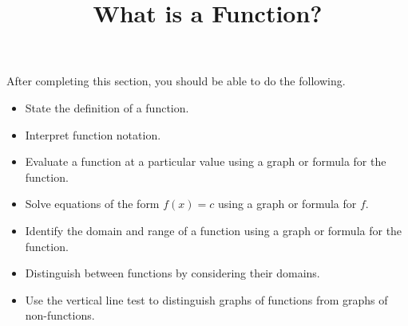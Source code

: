 \documentclass{ximera}
\title{What is a Function?}
\begin{document}
\begin{abstract} 
\end{abstract}

\maketitle

\begin{sectionOutcomes}
After completing this section, you should be able to do the following.

\begin{itemize}
	\item State the definition of a function.
	\item Interpret function notation.
	\item Evaluate a function at a particular value using a graph or formula for the function.
	\item Solve equations of the form $f(x) = c$ using a graph or formula for $f$.
	\item Identify the domain and range of a function using a graph or formula for the function.
	\item Distinguish between functions by considering their domains.
	\item Use the vertical line test to distinguish graphs of functions from graphs of non-functions.

\end{itemize}
\end{sectionOutcomes}
\end{document}
